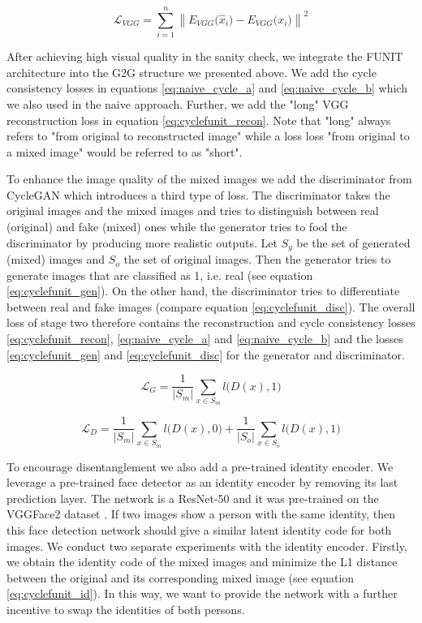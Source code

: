 \documentclass[conference]{IEEEtran}
\begin{document}
\begin{equation}
	\mathcal{L}_{VGG} = \sum_{i=1}^{n} \left\| E_{VGG} \big( \hat{x}_i \big) - E_{VGG} \big( {x}_i \big) \right\| ^2
	\label{eq:cyclefunit_recon}
\end{equation}

After achieving high visual quality in the sanity check, we integrate the FUNIT architecture into the G2G structure we presented above. We add the cycle consistency losses in equations \ref{eq:naive_cycle_a} and \ref{eq:naive_cycle_b} which we also used in the naive approach. Further, we add the "long" VGG reconstruction loss in equation \ref{eq:cyclefunit_recon}. Note that "long" always refers to "from original to reconstructed image" while a loss loss "from original to a mixed image" would be referred to as "short".

To enhance the image quality of the mixed images we add the discriminator from CycleGAN which introduces a third type of loss. The discriminator takes the original images and the mixed images and tries to distinguish between real (original) and fake (mixed) ones while the generator tries to fool the discriminator by producing more realistic outputs.
Let $S_g$ be the set of generated (mixed) images and $S_o$ the set of original images. Then the generator tries to generate images that are classified as 1, i.e. real (see equation \ref{eq:cyclefunit_gen}). On the other hand, the discriminator tries to differentiate between real and fake images (compare equation \ref{eq:cyclefunit_disc}). 
The overall loss of stage two therefore contains the reconstruction and cycle consistency losses \ref{eq:cyclefunit_recon}, \ref{eq:naive_cycle_a} and \ref{eq:naive_cycle_b} and the losses \ref{eq:cyclefunit_gen} and \ref{eq:cyclefunit_disc} for the generator and discriminator.

\begin{equation}
	\mathcal{L}_{G} = \frac{1}{|S_m|} \sum_{x \in S_m} l \big( D (x),1 \big) 
	\label{eq:cyclefunit_gen}
\end{equation}

\begin{equation}
	\mathcal{L}_{D} = \frac{1}{|S_m|} \sum_{x \in S_m} l \big( D (x),0 \big) + \frac{1}{|S_o|} \sum_{x \in S_o} l \big( D (x), 1 \big)
	\label{eq:cyclefunit_disc}
\end{equation}

To encourage disentanglement we also add a pre-trained identity encoder. We leverage a pre-trained face detector as an identity encoder by removing its last prediction layer. The network is a ResNet-50 \cite{he2015deep} and it was pre-trained on the VGGFace2 dataset \cite{cao2017vggface2}. If two images show a person with the same identity, then this face detection network should give a similar latent identity code for both images. 
We conduct two separate experiments with the identity encoder. Firstly, we obtain the identity code of the mixed images and minimize the L1 distance between the original and its corresponding mixed image (see equation  \ref{eq:cyclefunit_id}). In this way, we want to provide the network with a further incentive to swap the identities of both persons.
\end{document}
